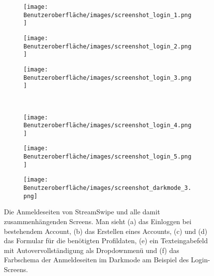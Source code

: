 \begin{figure}[tbt]
	\begin{subfigure}{0.33\textwidth}
	\centering
	\texttt{[image: Benutzeroberfläche/images/screenshot\_login\_1.png]}
	\caption{}
	\label{fig:login_a}
	\end{subfigure}
	\begin{subfigure}{0.33\textwidth}
	\centering
	\texttt{[image: Benutzeroberfläche/images/screenshot\_login\_2.png]}
	\caption{}
	\label{fig:login_b}
	\end{subfigure}
	\begin{subfigure}{0.33\textwidth}
	\centering
	\texttt{[image: Benutzeroberfläche/images/screenshot\_login\_3.png]}
	\caption{}
	\label{fig:login_c}
	\end{subfigure}\\ \vspace{1cm}	
	
	\begin{subfigure}{0.33\textwidth}
	\centering
	\texttt{[image: Benutzeroberfläche/images/screenshot\_login\_4.png]}
	\caption{}
	\label{fig:login_d}
	\end{subfigure}
	\begin{subfigure}{0.33\textwidth}
	\centering
	\texttt{[image: Benutzeroberfläche/images/screenshot\_login\_5.png]}
	\caption{}
	\label{fig:login_e}
	\end{subfigure}
	\begin{subfigure}{0.33\textwidth}
	\centering
	\texttt{[image: Benutzeroberfläche/images/screenshot\_darkmode\_3.png]}
	\caption{}
	\label{fig:login_f}
	\end{subfigure}
\caption[Screenshots der Anmeldeseiten]{Die Anmeldeseiten von StreamSwipe und alle damit zusammenhängenden Screens. Man sieht (a) das Einloggen bei bestehendem Account, (b) das Erstellen eines Accounts, (c) und (d) das Formular für die benötigten Profildaten, (e) ein Texteingabefeld mit Autovervollständigung als Dropdownmenü und (f) das Farbschema der Anmeldeseiten im Darkmode am Beispiel des Login-Screens.}
\label{fig:login_alle}
\end{figure}
\clearpage
